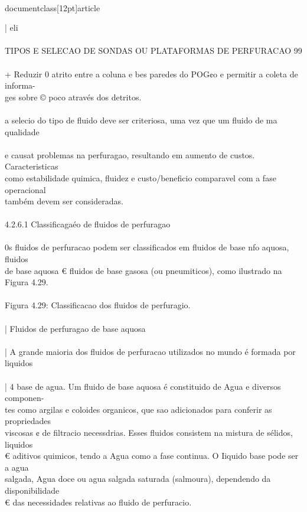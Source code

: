\\documentclass[12pt]{article}
\begin{document}
| eli\\
\\
TIPOS E SELECAO DE SONDAS OU PLATAFORMAS DE PERFURACAO 99\\
\\
+ Reduzir 0 atrito entre a coluna e bes paredes do POG¢o e permitir a coleta de informa-\\
ges sobre © poco através dos detritos.\\
\\
a selecio do tipo de fluido deve ser criteriosa, uma vez que um fluido de ma qualidade\\
\\
e causat problemas na perfuragao, resultando em aumento de custos. Caracteristicas\\
como estabilidade quimica, fluidez e custo/beneficio comparavel com a fase operacional\\
também devem ser consideradas.\\
\\
4.2.6.1 Classificagaéo de fluidos de perfuragao\\
\\
0s fluidos de perfuracao podem ser classificados em fluidos de base nfo aquosa, fluidos\\
de base aquosa € fluidos de base gasosa (ou pneumiticos), como ilustrado na Figura 4.29.\\
\\
Figura 4.29: Classificacao dos fluidos de perfuragio.\\
\\
| Fluidos de perfuragao de base aquosa\\
\\
| A grande maioria dos fluidos de perfuracao utilizados no mundo é formada por liquidos\\
\\
| 4 base de agua. Um fluido de base aquosa é constituido de Agua e diversos componen-\\
tes como argilas e coloides organicos, que sao adicionados para conferir as propriedades\\
viscosas ¢ de filtracio necessdrias. Esses fluidos consistem na mistura de sélidos, liquidos\\
€ aditivos quimicos, tendo a Agua como a fase continua. O Iiquido base pode ser a agua\\
salgada, Agua doce ou agua salgada saturada (salmoura), dependendo da disponibilidade\\
€ das necessidades relativas ao fluido de perfuracio.\\
\end{document}
